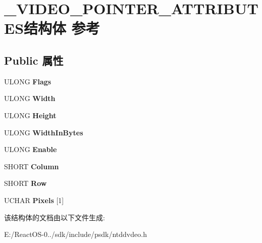\hypertarget{struct___v_i_d_e_o___p_o_i_n_t_e_r___a_t_t_r_i_b_u_t_e_s}{}\section{\+\_\+\+V\+I\+D\+E\+O\+\_\+\+P\+O\+I\+N\+T\+E\+R\+\_\+\+A\+T\+T\+R\+I\+B\+U\+T\+E\+S结构体 参考}
\label{struct___v_i_d_e_o___p_o_i_n_t_e_r___a_t_t_r_i_b_u_t_e_s}
\subsection*{Public 属性}
\begin{DoxyCompactItemize}
\item 
\mbox{\label{struct___v_i_d_e_o___p_o_i_n_t_e_r___a_t_t_r_i_b_u_t_e_s_a7872dbe8bd8a418c6803783616561512}} 
U\+L\+O\+NG {\bfseries Flags}
\item 
\mbox{\label{struct___v_i_d_e_o___p_o_i_n_t_e_r___a_t_t_r_i_b_u_t_e_s_a119eca7a2138718d2ba1746a5a936fa8}} 
U\+L\+O\+NG {\bfseries Width}
\item 
\mbox{\label{struct___v_i_d_e_o___p_o_i_n_t_e_r___a_t_t_r_i_b_u_t_e_s_a043acccc4801f3590082a8995dcb28b3}} 
U\+L\+O\+NG {\bfseries Height}
\item 
\mbox{\label{struct___v_i_d_e_o___p_o_i_n_t_e_r___a_t_t_r_i_b_u_t_e_s_aae73c0680a92848e8d01c39c9f65584c}} 
U\+L\+O\+NG {\bfseries Width\+In\+Bytes}
\item 
\mbox{\label{struct___v_i_d_e_o___p_o_i_n_t_e_r___a_t_t_r_i_b_u_t_e_s_a4b5eec65349179853cb038d5aad298bf}} 
U\+L\+O\+NG {\bfseries Enable}
\item 
\mbox{\label{struct___v_i_d_e_o___p_o_i_n_t_e_r___a_t_t_r_i_b_u_t_e_s_a6a4a8624c54f6c2206ced8bb4d4f097e}} 
S\+H\+O\+RT {\bfseries Column}
\item 
\mbox{\label{struct___v_i_d_e_o___p_o_i_n_t_e_r___a_t_t_r_i_b_u_t_e_s_af4bc78ae58f826cf3a3dcdfc52e75949}} 
S\+H\+O\+RT {\bfseries Row}
\item 
\mbox{\label{struct___v_i_d_e_o___p_o_i_n_t_e_r___a_t_t_r_i_b_u_t_e_s_a4b57425ae988e2fb4b8b20018134ec7d}} 
U\+C\+H\+AR {\bfseries Pixels} \mbox{[}1\mbox{]}
\end{DoxyCompactItemize}


该结构体的文档由以下文件生成\+:\begin{DoxyCompactItemize}
\item 
E\+:/\+React\+O\+S-\/0../sdk/include/psdk/ntddvdeo.\+h\end{DoxyCompactItemize}
